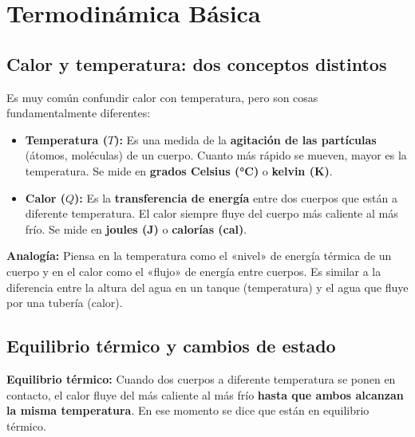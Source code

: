 \documentclass[12pt, a4paper]{article}
\begin{document}
\newpage

\section{Termodinámica Básica}

\subsection{Calor y temperatura: dos conceptos distintos}

Es muy común confundir calor con temperatura, pero son cosas fundamentalmente diferentes:

\begin{cuadroteoria}
\begin{itemize}[leftmargin=*]
  \item \textbf{Temperatura ($T$):} Es una medida de la \textbf{agitación de las partículas} (átomos, moléculas) de un cuerpo. Cuanto más rápido se mueven, mayor es la temperatura. Se mide en \textbf{grados Celsius (°C)} o \textbf{kelvin (K)}.

  \item \textbf{Calor ($Q$):} Es la \textbf{transferencia de energía} entre dos cuerpos que están a diferente temperatura. El calor siempre fluye del cuerpo más caliente al más frío. Se mide en \textbf{joules (J)} o \textbf{calorías (cal)}.
\end{itemize}
\end{cuadroteoria}

\begin{cuadroadvertencia}
\textbf{Analogía:} Piensa en la temperatura como el «nivel» de energía térmica de un cuerpo y en el calor como el «flujo» de energía entre cuerpos. Es similar a la diferencia entre la altura del agua en un tanque (temperatura) y el agua que fluye por una tubería (calor).
\end{cuadroadvertencia}

\subsection{Equilibrio térmico y cambios de estado}

\begin{cuadrosolucion}
\textbf{Equilibrio térmico:} Cuando dos cuerpos a diferente temperatura se ponen en contacto, el calor fluye del más caliente al más frío \textbf{hasta que ambos alcanzan la misma temperatura}. En ese momento se dice que están en equilibrio térmico.
\end{cuadrosolucion}
\end{document}
